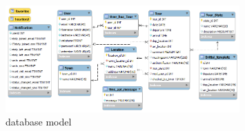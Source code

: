 \begin{figure}[h]
	\centering
	\includegraphics[width=0.8\textwidth]{images/Datenbank_Model}
	\caption{database model}
	\label{img:DBMod}
\end{figure}